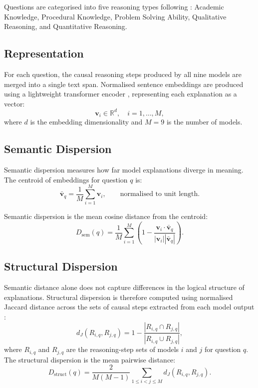 Questions are categorised into five reasoning types following \citet{hendrycks2021mmlu}:
Academic Knowledge, Procedural Knowledge, Problem Solving Ability, Qualitative
Reasoning, and Quantitative Reasoning.

\subsection{Representation}
\label{subsec:meth-embeddings}

For each question, the causal reasoning steps produced by all nine models are merged
into a single text span. Normalised sentence embeddings are produced using a
lightweight transformer encoder \citep{muennighoff2023mteb}, representing each
explanation as a vector:
\begin{equation}
  \mathbf{v}_{i} \in \mathbb{R}^{d}, \quad i = 1, \ldots, M,
  \label{eq:embedding}
\end{equation}
where $d$ is the embedding dimensionality and $M = 9$ is the number of models.

\subsection{Semantic Dispersion}
\label{subsec:meth-semantic}

Semantic dispersion measures how far model explanations diverge in meaning. The
centroid of embeddings for question $q$ is:
\begin{equation}
  \bar{\mathbf{v}}_{q} = \frac{1}{M}\sum_{i=1}^{M}\mathbf{v}_{i}, \qquad
  \text{normalised to unit length.}
  \label{eq:centroid}
\end{equation}

Semantic dispersion is the mean cosine distance from the centroid:
\begin{equation}
  D_{\mathrm{sem}}(q) = \frac{1}{M}\sum_{i=1}^{M}
    \left(1 - \frac{\mathbf{v}_{i}\cdot\bar{\mathbf{v}}_{q}}
                   {|\mathbf{v}_{i}||\bar{\mathbf{v}}_{q}|}\right).
  \label{eq:dsem}
\end{equation}

\subsection{Structural Dispersion}
\label{subsec:meth-structural}

Semantic distance alone does not capture differences in the logical structure of
explanations. Structural dispersion is therefore computed using normalised Jaccard
distance across the sets of causal steps extracted from each model output
\citep{wahyuningsih2021text, rinjeni2024matching}:
\begin{equation}
  d_J(R_{i,q}, R_{j,q}) = 1 - \frac{|R_{i,q} \cap R_{j,q}|}{|R_{i,q} \cup R_{j,q}|},
  \label{eq:jaccard}
\end{equation}
where $R_{i,q}$ and $R_{j,q}$ are the reasoning-step sets of models $i$ and $j$ for
question $q$. The structural dispersion is the mean pairwise distance:
\begin{equation}
  D_{\mathrm{struct}}(q) = \frac{2}{M(M-1)}\sum_{1 \le i < j \le M}d_J(R_{i,q},R_{j,q}).
  \label{eq:dstruct}
\end{equation}

